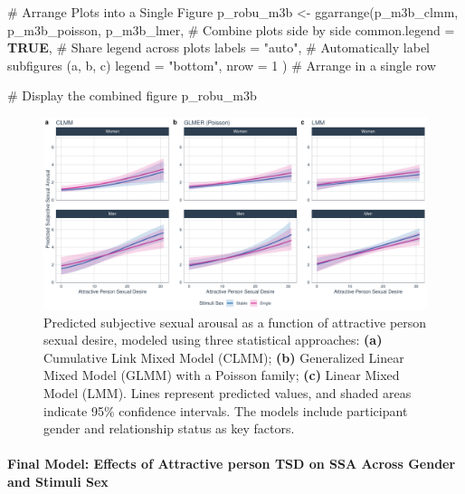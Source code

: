 \documentclass[
  bookmarksnumbered]{article}
\newenvironment{Shaded}{\begin{snugshade}}{\end{snugshade}}
\newcommand{\AttributeTok}[1]{\textcolor[rgb]{0.80,0.80,0.80}{#1}}
\newcommand{\CommentTok}[1]{\textcolor[rgb]{0.50,0.62,0.50}{#1}}
\newcommand{\ConstantTok}[1]{\textcolor[rgb]{0.86,0.64,0.64}{\textbf{#1}}}
\newcommand{\DecValTok}[1]{\textcolor[rgb]{0.86,0.86,0.80}{#1}}
\newcommand{\FunctionTok}[1]{\textcolor[rgb]{0.94,0.94,0.56}{#1}}
\newcommand{\NormalTok}[1]{\textcolor[rgb]{0.80,0.80,0.80}{#1}}
\newcommand{\OtherTok}[1]{\textcolor[rgb]{0.94,0.94,0.56}{#1}}
\newcommand{\StringTok}[1]{\textcolor[rgb]{0.80,0.58,0.58}{#1}}
\begin{document}
\begin{Shaded}
\begin{Highlighting}[]
\CommentTok{\# Arrange Plots into a Single Figure}
\NormalTok{p\_robu\_m3b }\OtherTok{\textless{}{-}} \FunctionTok{ggarrange}\NormalTok{(p\_m3b\_clmm, p\_m3b\_poisson, p\_m3b\_lmer, }\CommentTok{\# Combine plots side by side}
  \AttributeTok{common.legend =} \ConstantTok{TRUE}\NormalTok{, }\CommentTok{\# Share legend across plots}
  \AttributeTok{labels =} \StringTok{"auto"}\NormalTok{, }\CommentTok{\# Automatically label subfigures (a, b, c)}
  \AttributeTok{legend =} \StringTok{"bottom"}\NormalTok{,}
  \AttributeTok{nrow =} \DecValTok{1}
\NormalTok{) }\CommentTok{\# Arrange in a single row}

\CommentTok{\# Display the combined figure}
\NormalTok{p\_robu\_m3b}
\end{Highlighting}
\end{Shaded}

\begin{figure}
\centering
\includegraphics{Sexual_Desire_Arousal_V2_files/figure-latex/preds-m3b-1.pdf}
\caption{\label{fig:preds-m3b}Predicted subjective sexual arousal as a function of attractive person sexual desire, modeled using three statistical approaches: \textbf{(a)} Cumulative Link Mixed Model (CLMM); \textbf{(b)} Generalized Linear Mixed Model (GLMM) with a Poisson family; \textbf{(c)} Linear Mixed Model (LMM). Lines represent predicted values, and shaded areas indicate 95\% confidence intervals. The models include participant gender and relationship status as key factors.}
\end{figure}

\paragraph{Final Model: Effects of Attractive person TSD on SSA Across Gender and Stimuli Sex}\label{final-model-effects-of-attractive-person-tsd-on-ssa-across-gender-and-stimuli-sex-1}
\end{document}
